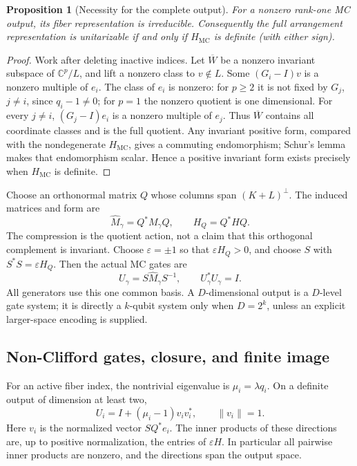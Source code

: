 \documentclass[11pt,a4paper]{article}
\newtheorem{proposition}[theorem]{Proposition}
\theoremstyle{remark}\newtheorem{remark}[theorem]{Remark}
\newcommand{\C}{\mathbb C}
\newcommand{\MC}{\operatorname{MC}}
\begin{document}
\begin{proposition}[Necessity for the complete output]
For a nonzero rank-one MC output, its fiber representation is irreducible.
Consequently the full arrangement representation is unitarizable if and
only if $H_{\MC}$ is definite (with either sign).
\end{proposition}
\begin{proof}
Work after deleting inactive indices. Let $\overline W$ be a nonzero
invariant subspace of $\C^p/L$, and lift a nonzero class to $v\notin L$.
Some $(G_i-I)v$ is a nonzero multiple of $e_i$. The class of $e_i$ is
nonzero: for $p\ge2$ it is not fixed by $G_j$, $j\ne i$, since
$q_i-1\ne0$; for $p=1$ the nonzero quotient is one dimensional.
For every $j\ne i$, $(G_j-I)e_i$ is a nonzero multiple of $e_j$.
Thus $\overline W$ contains all coordinate classes and is the full
quotient. Any invariant positive form, compared with the nondegenerate
$H_{\MC}$, gives a commuting endomorphism; Schur's lemma makes that
endomorphism scalar. Hence a positive invariant form exists precisely
when $H_{\MC}$ is definite.
\end{proof}

Choose an orthonormal matrix $Q$ whose columns span $(K+L)^\perp$.
The induced matrices and form are
\[
 \widehat M_\gamma=Q^*M_\gamma Q,\qquad H_Q=Q^*HQ.
\]
The compression is the quotient action, not a claim that this orthogonal
complement is invariant. Choose $\varepsilon=\pm1$ so that
$\varepsilon H_Q>0$, and choose $S$ with $S^*S=\varepsilon H_Q$.
Then the actual MC gates are
\begin{equation}\label{mc:eq:gates}
 U_\gamma=S\widehat M_\gamma S^{-1},\qquad U_\gamma^*U_\gamma=I.
\end{equation}
All generators use this one common basis. A $D$-dimensional output is
a $D$-level gate system; it is directly a $k$-qubit system only when
$D=2^k$, unless an explicit larger-space encoding is supplied.

\subsection{Non-Clifford gates, closure, and finite image}
For an active fiber index, the nontrivial eigenvalue is
$\mu_i=\lambda q_i$. On a definite output of dimension at least two,
\[
 U_i=I+(\mu_i-1)v_iv_i^*,\qquad \|v_i\|=1.
\]
Here $v_i$ is the normalized vector $SQ^*e_i$.
The inner products of these directions are, up to positive normalization,
the entries of $\varepsilon H$. In particular all pairwise inner products
are nonzero, and the directions span the output space.
\end{document}
